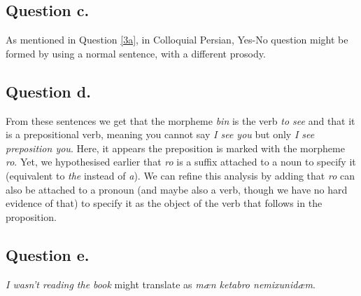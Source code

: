 \documentclass{Cours}
\begin{document}
\subsection{Question c.}
As mentioned in Question \ref{3a}, in Colloquial Persian, Yes-No question might be formed by using a normal sentence, with a different prosody.

\subsection{Question d.}
From these sentences we get that the morpheme \textsl{bin} is the verb \textsl{to see} and that it is a prepositional verb, meaning you cannot say \textsl{I see you} but only \textsl{I see \emph{preposition} you}. Here, it appears the preposition is marked with the morpheme \textsl{ro}.
Yet, we hypothesised earlier that \textsl{ro} is a suffix attached to a noun to specify it (equivalent to \textsl{the} instead of \textsl{a}). We can refine this analysis by adding that \textsl{ro} can also be attached to a pronoun (and maybe also a verb, though we have no hard evidence of that) to specify it as the object of the verb that follows in the proposition.

\subsection{Question e.}
\textsl{I wasn't reading the book} might translate as \textsl{mæn ketabro nemixunidæm}.
\end{document}
